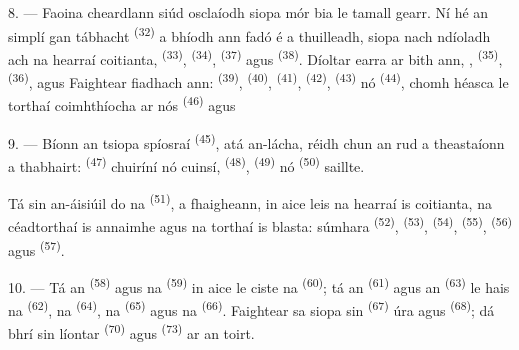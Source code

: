 \VUsaut{4.0mm}
\VUsaut{3.0mm}

8. --- Faoina cheardlann siúd osclaíodh siopa mór bia le tamall gearr. Ní hé an
 simplí gan tábhacht \textsuperscript{(32)} a bhíodh ann fadó
é a thuilleadh, siopa nach ndíoladh ach na hearraí coitianta, 
\textsuperscript{(33)},  \textsuperscript{(34)},  \textsuperscript{(37)} agus  \textsuperscript{(38)}. Díoltar
earra ar bith ann, , 
\textsuperscript{(35)},  \textsuperscript{(36)}, 
 agus  Faightear fiadhach
ann:  \textsuperscript{(39)}, 
\textsuperscript{(40)},  \textsuperscript{(41)}, 
\textsuperscript{(42)},  \textsuperscript{(43)} nó
 \textsuperscript{(44)}, chomh héasca le torthaí coimhthíocha ar nós
 \textsuperscript{(46)} agus 

9. --- Bíonn  an tsiopa spíosraí \textsuperscript{(45)}, atá
an-lácha, réidh chun an rud a theastaíonn a thabhairt: 
\textsuperscript{(47)} chuiríní nó cuinsí,  \textsuperscript{(48)},
 \textsuperscript{(49)} nó  \textsuperscript{(50)}
saillte.

Tá sin an-áisiúil do na  \textsuperscript{(51)}, a
fhaigheann, in aice leis na hearraí is coitianta, na céadtorthaí is annaimhe agus na
torthaí is blasta:  súmhara \textsuperscript{(52)},
 \textsuperscript{(53)},  \textsuperscript{(54)},
 \textsuperscript{(55)},  \textsuperscript{(56)}
agus  \textsuperscript{(57)}.

\VUsaut{4.0mm}
\VUsaut{3.0mm}

10. --- Tá an  \textsuperscript{(58)} agus na 
\textsuperscript{(59)} in aice le ciste na 
\textsuperscript{(60)}; tá an  \textsuperscript{(61)} agus an
 \textsuperscript{(63)} le hais na 
\textsuperscript{(62)}, na  \textsuperscript{(64)}, na  \textsuperscript{(65)} agus na 
\textsuperscript{(66)}. Faightear sa siopa sin 
\textsuperscript{(67)} úra agus  \textsuperscript{(68)}; dá bhrí sin
líontar  \textsuperscript{(70)} agus 
\textsuperscript{(73)} ar an toirt.

